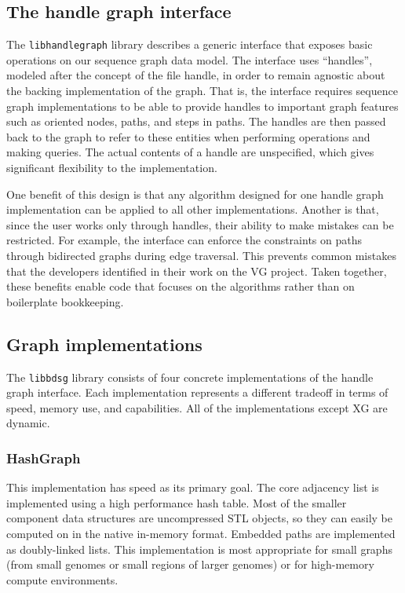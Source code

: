 \documentclass{article}
\begin{document}
\subsection{The handle graph interface}

The \texttt{libhandlegraph} library describes a generic interface that exposes basic operations on our sequence graph data model. The interface uses ``handles'', modeled after the concept of the file handle, in order to remain agnostic about the backing implementation of the graph. That is, the interface requires sequence graph implementations to be able to provide handles to important graph features such as oriented nodes, paths, and steps in paths. The handles are then passed back to the graph to refer to these entities when performing operations and making queries. The actual contents of a handle are unspecified, which gives significant flexibility to the implementation.

One benefit of this design is that any algorithm designed for one handle graph implementation can be applied to all other implementations. Another is that, since the user works only through handles, their ability to make mistakes can be restricted. For example, the interface can enforce the constraints on paths through bidirected graphs during edge traversal. This prevents common mistakes that the developers identified in their work on the VG project. Taken together, these benefits enable code that focuses on the algorithms rather than on boilerplate bookkeeping.

\subsection{Graph implementations}

The \texttt{libbdsg} library consists of four concrete implementations of the handle graph interface. Each implementation represents a different tradeoff in terms of speed, memory use, and capabilities. All of the implementations except XG are dynamic.

\subsubsection{HashGraph}

This implementation has speed as its primary goal. The core adjacency list is implemented using a high performance hash table. Most of the smaller component data structures are uncompressed STL objects, so they can easily be computed on in the native in-memory format. Embedded paths are implemented as doubly-linked lists. This implementation is most appropriate for small graphs (from small genomes or small regions of larger genomes) or for high-memory compute environments.
\end{document}
